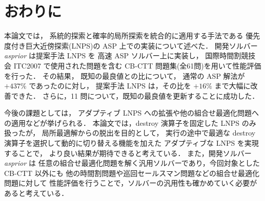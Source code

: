 \chapter{おわりに}

本論文では，
系統的探索と確率的局所探索を統合的に適用する手法である
優先度付き巨大近傍探索(LNPS)の ASP 上での実装について述べた．
開発ソルバー \textit{asprior} は提案手法 LNPS を
高速 ASP ソルバー{\clingo}上に実装し，
国際時間割競技会 ITC2007 で使用された問題を含む
 CB-CTT 問題集(全61問)を用いて性能評価を行った．
その結果，
既知の最良値との比について，
通常の ASP 解法が $+437\%$ であったのに対し，
提案手法 LNPS は，その比を $+16\%$ まで大幅に改善できた．
さらに，11 問について，既知の最良値を更新することに成功した．

今後の課題としては，
アダプティブ LNPS への拡張や他の組合せ最適化問題への適用などが挙げられる．
本論文では，destroy 演算子を固定した LNPS のみ扱ったが，
局所最適解からの脱出を目的として，
実行の途中で最適な destroy 演算子を選択して動的に切り替える機能を加えた
アダプティブな LNPS を実現することで，
より良い結果が期待できると考えている．
また，開発ソルバー \textit{asprior} は
任意の組合せ最適化問題を解く汎用ソルバーであり，今回対象とした CB-CTT 以外にも
他の時間割問題や巡回セールスマン問題などの組合せ最適化問題に対して
性能評価を行うことで，ソルバーの汎用性も確かめていく必要があると考えている．



